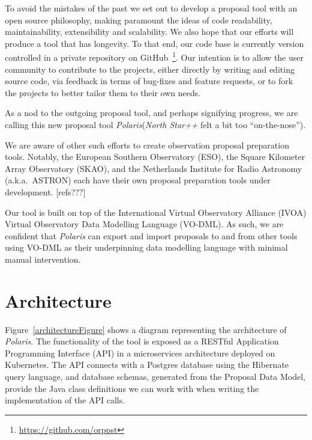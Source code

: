 \documentclass[11pt,twoside]{article}
\begin{document}
To avoid the mistakes of the past we set out to develop a proposal tool with an open source philosophy, making
paramount the ideas of code readability, maintainability, extensibility and scalability.
We also hope that our efforts will produce a tool that has longevity.
To that end, our code base is currently version controlled in a private repository on
GitHub~\footnote{\url{https://github.com/orppst}}.
Our intention is to allow the user community to contribute to the projects, either directly by writing and
editing source code, via feedback in terms of bug-fixes and feature requests, or to fork the projects to
better tailor them to their own needs.

As a nod to the outgoing proposal tool, and perhaps signifying progress, we are calling this new proposal tool
\emph{Polaris}(\emph{North Star++} felt a bit too ``on-the-nose'').

We are aware of other such efforts to create observation proposal preparation tools.
Notably, the European Southern Observatory (ESO), the Square Kilometer Array Observatory (SKAO), and the
Netherlands Institute for Radio Astronomy (a.k.a.\ ASTRON) each have their own proposal preparation tools
under development.
[refs???]

Our tool is built on top of the International Virtual Observatory Alliance (IVOA) Virtual
Observatory Data Modelling Language (VO-DML).
As such, we are confident that \emph{Polaris} can export and import proposals to and from other tools using
VO-DML as their underpinning data modelling language with minimal manual intervention.

\section{Architecture}\label{sec:architecture}


\clearpage

Figure~\ref{architectureFigure} shows a diagram representing the architecture of \emph{Polaris}.
The functionality of the tool is exposed as a RESTful Application Programming Interface (API) in a
microservices architecture deployed on Kubernetes.
The API connects with a Postgres database using the Hibernate query language, and database schemas, generated
from the Proposal Data Model, provide the Java class definitions we can work with when writing the implementation
of the API calls.
\end{document}
